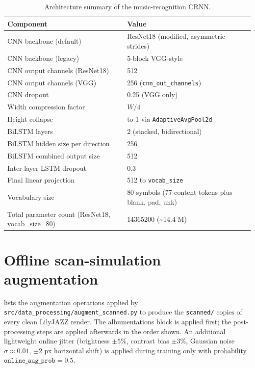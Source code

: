 \begin{table}[H]
\centering\small
\setlength{\tabcolsep}{5pt}
\renewcommand{\arraystretch}{1.30}
\begin{tabularx}{\textwidth}{@{} L l @{}}
\toprule
\textbf{Component} & \textbf{Value} \\
\midrule
CNN backbone (default)              & ResNet18 (modified, asymmetric strides) \\
CNN backbone (legacy)               & 5-block VGG-style \\
CNN output channels (ResNet18)      & 512 \\
CNN output channels (VGG)           & 256 (\texttt{cnn\_out\_channels}) \\
CNN dropout                         & 0.25 (VGG only) \\
Width compression factor            & $W / 4$ \\
Height collapse                     & to 1 via \texttt{AdaptiveAvgPool2d} \\
BiLSTM layers                       & 2 (stacked, bidirectional) \\
BiLSTM hidden size per direction    & 256 \\
BiLSTM combined output size         & 512 \\
Inter-layer LSTM dropout            & 0.3 \\
Final linear projection             & 512 to \texttt{vocab\_size} \\
Vocabulary size                     & \num{80} symbols (\num{77} content tokens plus blank, pad, unk) \\
Total parameter count (ResNet18, vocab\_size=80) & \num{14365200} (\textasciitilde\num{14.4} M) \\
\bottomrule
\end{tabularx}
\caption{Architecture summary of the music-recognition CRNN.}
\label{tab:arch-omr}
\end{table}

\section{Offline scan-simulation augmentation}

 lists the augmentation operations applied by \texttt{src/data\_processing/augment\_scanned.py} to produce the \texttt{scanned/} copies of every clean LilyJAZZ render. The albumentations block is applied first; the post-processing steps are applied afterwards in the order shown. An additional lightweight online jitter (brightness $\pm 5 \%$, contrast bias $\pm 3 \%$, Gaussian noise $\sigma \approx 0.01$, $\pm 2$ px horizontal shift) is applied during training only with probability $\texttt{online\_aug\_prob} = 0.5$.

